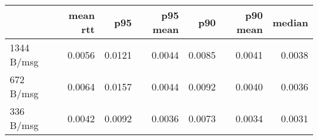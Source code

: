 \begin{tabular}{l|rrrrrr}
\rowcolor{gray!50}
 & mean rtt & p95 & p95 mean & p90 & p90 mean & median\\\hline
1344 B/msg & 0.0056 & 0.0121 & 0.0044 & 0.0085 & 0.0041 & 0.0038 \\
672 B/msg & 0.0064 & 0.0157 & 0.0044 & 0.0092 & 0.0040 & 0.0036 \\
336 B/msg & 0.0042 & 0.0092 & 0.0036 & 0.0073 & 0.0034 & 0.0031 \\
\end{tabular}
